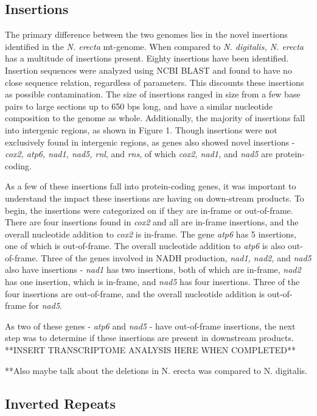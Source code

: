 \documentclass[../main.tex]{subfiles}
\begin{document}
\subsection{Insertions}
The primary difference between the two genomes lies in the novel insertions identified in the \emph{N. erecta} mt-genome. When compared to \emph{N. digitalis, N. erecta} has a multitude of insertions present. Eighty insertions have been identified. Insertion sequences were analyzed using NCBI BLAST and found to have no close sequence relation, regardless of parameters. This discounts these insertions as possible contamination. The size of insertions ranged in size from a few base pairs to large sections up to 650 bps long, and have a similar nucleotide composition to the genome as whole. Additionally, the majority of insertions fall into intergenic regions, as shown in Figure 1. Though insertions were not exclusively found in intergenic regions, as genes also showed novel insertions - \emph{cox2, atp6, nad1, nad5, rnl}, and \emph{rns}, of which \emph{cox2, nad1,} and \emph{nad5} are protein-coding.

As a few of these insertions fall into protein-coding genes, it was important to understand the impact these insertions are having on down-stream products. To begin, the insertions were categorized on if they are in-frame or out-of-frame. There are four insertions found in \emph{cox2} and all are in-frame insertions, and the overall nucleotide addition to \emph{cox2} is in-frame. The gene \emph{atp6} has 5 insertions, one of which is out-of-frame. The overall nucleotide addition to \emph{atp6} is also out-of-frame. Three of the genes involved in NADH production, \emph{nad1, nad2,} and \emph{nad5} also have insertions - \emph{nad1} has two insertions, both of which are in-frame, \emph{nad2} has one insertion, which is in-frame, and \emph{nad5} has four insertions. Three of the four insertions are out-of-frame, and the overall nucleotide addition is out-of-frame for \emph{nad5}. 

As two of these genes - \emph{atp6} and \emph{nad5} - have out-of-frame insertions, the next step was to determine if these insertions are present in downstream products. **INSERT TRANSCRIPTOME ANALYSIS HERE WHEN COMPLETED**

**Also maybe talk about the deletions in N. erecta was compared to N. digitalis.

\subsection{Inverted Repeats}
\end{document}
